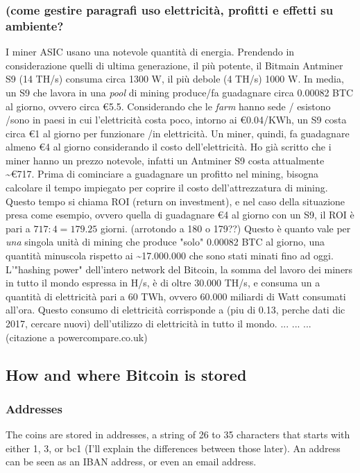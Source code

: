 \documentclass {article}
\begin{document}
\subsubsection {(come gestire paragrafi uso elettricità, profitti e effetti su ambiente?}


I miner ASIC usano una notevole quantità di energia. Prendendo in considerazione quelli di ultima generazione, il più potente, il Bitmain Antminer S9 (14 TH/s) consuma circa 1300 W, il più debole (4 TH/s) 1000 W.
In media, un S9 che lavora in una \textit{pool} di mining produce/fa guadagnare circa 0.00082 BTC al giorno, ovvero circa \euro{}5.5.
Considerando che le \textit{farm} hanno sede / esistono /sono in paesi in cui l'elettricità costa poco, intorno ai \euro{}0.04/KWh, un S9 costa circa \euro{}1 al giorno per funzionare /in elettricità.
Un miner, quindi, fa guadagnare almeno \euro{}4 al giorno considerando il costo dell'elettricità.
Ho già scritto che i miner hanno un prezzo notevole, infatti un Antminer S9 costa attualmente \textasciitilde \euro{}717.
Prima di cominciare a guadagnare un profitto nel mining, bisogna calcolare il tempo impiegato per coprire il costo dell'attrezzatura di mining.
Questo tempo si chiama ROI (return on investment), e nel caso della situazione presa come esempio, ovvero quella di guadagnare \euro{}4 al giorno con un S9, il ROI è pari a $717 : 4 = 179.25$ giorni. (arrotondo a 180 o 179??)
Questo è quanto vale per \textit{una} singola unità di mining che produce "solo" 0.00082 BTC al giorno, una quantità minuscola rispetto ai \textasciitilde 17.000.000 che sono stati minati fino ad oggi.
L'"hashing power" dell'intero network del Bitcoin, la somma del lavoro dei miners in tutto il mondo espressa in H/s, è di oltre 30.000 TH/s, e consuma un a quantità di elettricità pari a 60 TWh, ovvero 60.000 miliardi di Watt consumati all'ora.
Questo consumo di elettricità corrisponde a (piu di 0.13, perche dati dic 2017, cercare nuovi) dell'utilizzo di elettricità in tutto il mondo.
... ... ... (citazione a powercompare.co.uk)


\subsection {How and where Bitcoin is stored}


\subsubsection {Addresses}


The coins are stored in addresses, a string of 26 to 35 characters that starts with either 1, 3, or bc1 (I'll explain the differences between those later). An address can be seen as an IBAN address, or even an email address.
\end{document}
